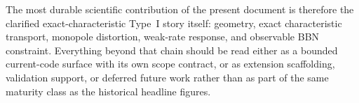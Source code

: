The most durable scientific contribution of the present document is therefore the clarified exact-characteristic Type~I story itself: geometry, exact characteristic transport, monopole distortion, weak-rate response, and observable BBN constraint.  Everything beyond that chain should be read either as a bounded current-code surface with its own scope contract, or as extension scaffolding, validation support, or deferred future work rather than as part of the same maturity class as the historical headline figures.


